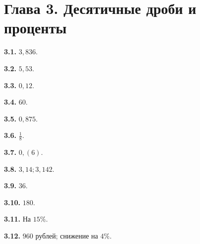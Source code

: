 \documentclass[12pt,a4paper,oneside,openany]{book}
\theoremstyle{colordef}\newtheorem{definition}{Определение}[chapter]
\theoremstyle{plain}\newtheorem{theorem}{Теорема}[chapter]
\theoremstyle{definition}\newtheorem{axiom}{Аксиома}[chapter]
\begin{document}
\section*{Глава 3. Десятичные дроби и проценты}
\begingroup\setlength{\parskip}{3pt}
\textbf{3.1.} \(3{,}836\).\par
\textbf{3.2.} \(5{,}53\).\par
\textbf{3.3.} \(0{,}12\).\par
\textbf{3.4.} \(60\).\par
\textbf{3.5.} \(0{,}875\).\par
\textbf{3.6.} \(\frac{1}{8}\).\par
\textbf{3.7.} \(0{,}(6)\).\par
\textbf{3.8.} \(3{,}14;\allowbreak 3{,}142\).\par
\textbf{3.9.} \(36\).\par
\textbf{3.10.} \(180\).\par
\textbf{3.11.} На \(15 \%\).\par
\textbf{3.12.} \(960\) рублей; снижение на \(4 \%\).\par
\end{document}
